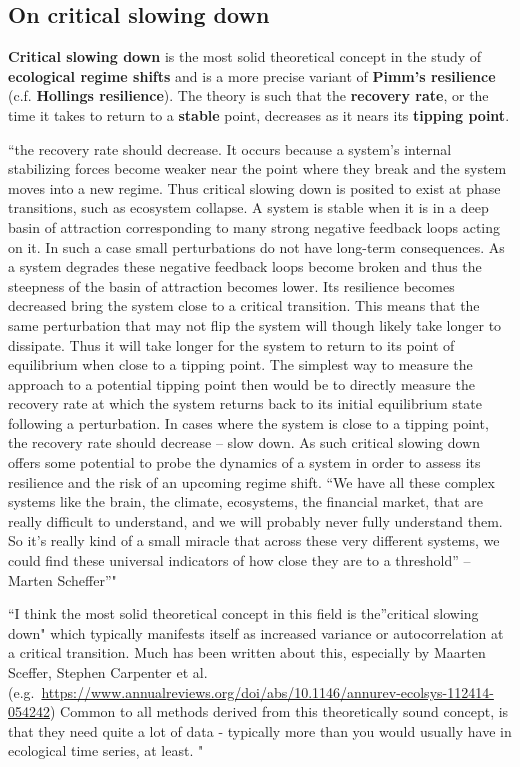 \documentclass[12pt,twoside]{reedthesis}
\begin{document}
\subsection{On critical slowing down}\label{on-critical-slowing-down}

\textbf{Critical slowing down} is the most solid theoretical concept in
the study of \textbf{ecological regime shifts} and is a more precise
variant of \textbf{Pimm's resilience} (c.f. \textbf{Hollings
resilience}). The theory is such that the \textbf{recovery rate}, or the
time it takes to return to a \textbf{stable} point, decreases as it
nears its \textbf{tipping point}.

``the recovery rate should decrease. It occurs because a system's
internal stabilizing forces become weaker near the point where they
break and the system moves into a new regime. Thus critical slowing down
is posited to exist at phase transitions, such as ecosystem collapse. A
system is stable when it is in a deep basin of attraction corresponding
to many strong negative feedback loops acting on it. In such a case
small perturbations do not have long-term consequences. As a system
degrades these negative feedback loops become broken and thus the
steepness of the basin of attraction becomes lower. Its resilience
becomes decreased bring the system close to a critical transition. This
means that the same perturbation that may not flip the system will
though likely take longer to dissipate. Thus it will take longer for the
system to return to its point of equilibrium when close to a tipping
point. The simplest way to measure the approach to a potential tipping
point then would be to directly measure the recovery rate at which the
system returns back to its initial equilibrium state following a
perturbation. In cases where the system is close to a tipping point, the
recovery rate should decrease -- slow down. As such critical slowing
down offers some potential to probe the dynamics of a system in order to
assess its resilience and the risk of an upcoming regime shift. ``We
have all these complex systems like the brain, the climate, ecosystems,
the financial market, that are really difficult to understand, and we
will probably never fully understand them. So it's really kind of a
small miracle that across these very different systems, we could find
these universal indicators of how close they are to a threshold'' --
Marten Scheffer''"

``I think the most solid theoretical concept in this field is
the''critical slowing down" which typically manifests itself as
increased variance or autocorrelation at a critical transition. Much has
been written about this, especially by Maarten Sceffer, Stephen
Carpenter et al.
(e.g.~\url{https://www.annualreviews.org/doi/abs/10.1146/annurev-ecolsys-112414-054242})
Common to all methods derived from this theoretically sound concept, is
that they need quite a lot of data - typically more than you would
usually have in ecological time series, at least. "
\end{document}
